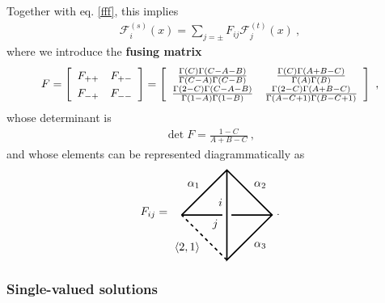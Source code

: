 \documentclass[12pt, a4paper, notitlepage, twoside]{report}
\numberwithin{equation}{section}
\theoremstyle{break}
\begin{document}
Together with eq. \eqref{fff}, this implies 
\begin{align}
 \mathcal{F}^{(s)}_i(x) = \sum_{j=\pm} F_{ij} \mathcal{F}^{(t)}_j(x)\ ,
\label{gfg}
\end{align}
where we introduce the \textbf{fusing matrix} 
\begin{align}
 F = \left[\begin{array}{cc} F_{++} & F_{+-} \\ F_{-+} & F_{--} \end{array}\right] 
= \left[\renewcommand{\arraystretch}{1.3}\begin{array}{cc}
         \frac{\Gamma(C)\Gamma(C-A-B)}{\Gamma(C-A)\Gamma(C-B)} & \frac{\Gamma(C)\Gamma(A+B-C)}{\Gamma(A)\Gamma(B)} 
       \\   \frac{\Gamma(2-C)\Gamma(C-A-B)}{\Gamma(1-A)\Gamma(1-B)} & \frac{\Gamma(2-C)\Gamma(A+B-C)}{\Gamma(A-C+1)\Gamma(B-C+1)}
        \end{array}\right]\ ,
\label{fmd}
\end{align}
whose determinant is 
\begin{align}
 \det F = \frac{1-C}{A+B-C}\ ,
\label{detf}
\end{align}
and whose elements can be represented diagrammatically as
\begin{align}
F_{ij} =
\begin{tikzpicture}[baseline=(current  bounding  box.center), very thick, scale = .7]
\draw (-2, 0) -- node [above left] {$\alpha_1$} (0, 2) -- node [above right] {$\alpha_2$} (2, 0) -- node [below right] {$\alpha_3$} (0, -2) -- (0, 2);
\draw[dashed] (0, -2) -- node [below left] {$\langle 2,1 \rangle$} (-2, 0);
\draw (-2, 0) -- (-.2, 0) node [below left] {$j$}; \draw (.2, 0) -- (2, 0);
\node [above left] at (0, .2) {$i$};
\end{tikzpicture}
\ .
\label{fpic}
\end{align}

\subsubsection{Single-valued solutions}
\end{document}
